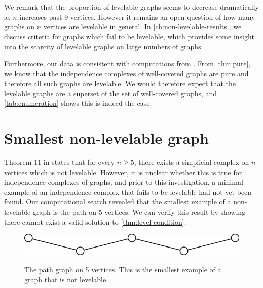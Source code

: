 We remark that the proportion of levelable graphs seems to decrease dramatically as $n$ increases past 9 vertices. However it remains an open question of how many graphs on $n$ vertices are levelable in general. In \autoref{ch:non-levelable-results}, we discuss criteria for graphs which fail to be levelable, which provides some insight into the scarcity of levelable graphs on large numbers of graphs. 

Furthermore, our data is consistent with computations from \cite{Baker2016}. From \autoref{thm:pure}, we know that the independence complexes of well-covered graphs are pure and therefore all such graphs are levelable. We would therefore expect that the levelable graphs are a superset of the set of well-covered graphs, and \autoref{tab:enumeration} shows this is indeed the case.

\section{Smallest non-levelable graph} \label{sec:smallest}

Theorem 11 in \cite{VanTuyl2010} states that for every $n \geq 5$, there exists a simplicial complex on $n$ vertices which is not levelable. However, it is unclear whether this is true for independence complexes of graphs, and prior to this investigation, a minimal example of an independence complex that fails to be levelable had not yet been found. Our computational search revealed that the smallest example of a non-levelable graph is the path on 5 vertices. We can verify this result by showing there cannot exist a valid solution to \autoref{thm:level-condition}.
\begin{figure}[bth]
    \myfloatalign
    \vspace{0.5cm}
    {\includegraphics[width=.55\linewidth]{figures/5-path.png}} 
    \vspace{0.5cm}
    \caption{The path graph on 5 vertices. This is the smallest example of a graph that is not levelable.}
\end{figure}

